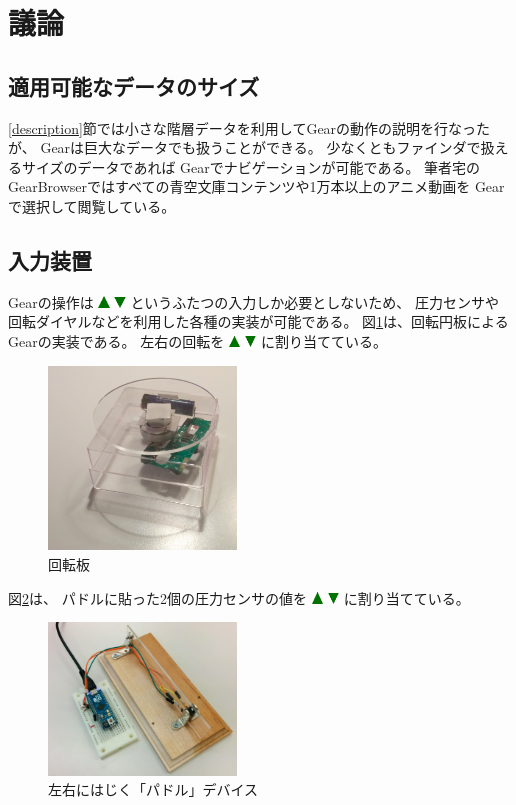 \documentclass[twoside]{wiss}
\def\GEAR{\textsf{Gear}}
\def\GB{\textsf{GearBrowser}}
\def\up{ \includegraphics[width=3mm,bb=0 0 36 36]{figures/uptriangle.pdf} }
\def\down{ \includegraphics[width=3mm,bb=0 0 36 36]{figures/downtriangle.pdf} }
\begin{document}
\section{議論}

\subsection{適用可能なデータのサイズ}

\ref{description}節では小さな階層データを利用して{\GEAR}の動作の説明を行なったが、
{\GEAR}は巨大なデータでも扱うことができる。
少なくともファインダで扱えるサイズのデータであれば
{\GEAR}でナビゲーションが可能である。
%
筆者宅の{\GB}ではすべての青空文庫コンテンツや1万本以上のアニメ動画を
{\GEAR}で選択して閲覧している。


\subsection{入力装置}


{\GEAR}の操作は{\up}{\down}というふたつの入力しか必要としないため、
圧力センサや回転ダイヤルなどを利用した各種の実装が可能である。
%
図\ref{disk}は、回転円板による{\GEAR}の実装である。
左右の回転を{\up}{\down}に割り当てている。

\begin{figure}[H]
\centerline{\includegraphics[width=50mm,bb=0 0 362 354]{figures/ff2d18e66f9a4655dbb5e22e0bb9a0ae.png}}
\caption{回転板}
\label{disk}
\end{figure}

図\ref{paddle}は、
パドルに貼った2個の圧力センサの値を{\up}{\down}に割り当てている。

\begin{figure}[H]
\centerline{\includegraphics[width=50mm,bb=0 0 514 418]{figures/3c2de63899653056f3c6be835b9aaf43.png}}
\caption{左右にはじく「パドル」デバイス}
\label{paddle}
\end{figure}
\end{document}
